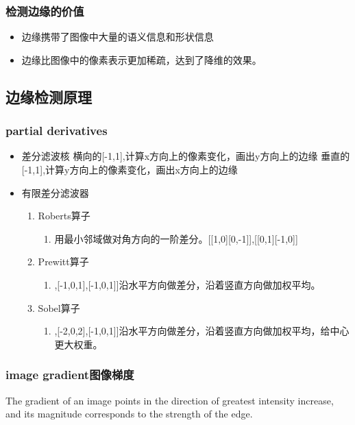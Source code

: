 \documentclass[UTF8]{ctexart}
\begin{document}
\subsubsection{检测边缘的价值}
\begin{itemize}
    \item 边缘携带了图像中大量的语义信息和形状信息
    \item 边缘比图像中的像素表示更加稀疏，达到了降维的效果。
\end{itemize}

\subsection{边缘检测原理}

\subsubsection{partial derivatives}
\begin{itemize}
    \item 差分滤波核
    横向的[-1,1],计算x方向上的像素变化，画出y方向上的边缘
    垂直的[-1,1],计算y方向上的像素变化，画出x方向上的边缘

    \item 有限差分滤波器
    \begin{enumerate}
        \item Roberts算子
        \begin{enumerate}
            \item 用最小邻域做对角方向的一阶差分。[[1,0][0,-1]],[[0,1][-1,0]]
        \end{enumerate}
        \item Prewitt算子
        \begin{enumerate}
            \item [[-1,0,1],[-1,0,1],[-1,0,1]]沿水平方向做差分，沿着竖直方向做加权平均。
        \end{enumerate}
        \item Sobel算子
        \begin{enumerate}
            \item [[-1,0,1],[-2,0,2],[-1,0,1]]沿水平方向做差分，沿着竖直方向做加权平均，给中心更大权重。
        \end{enumerate}
    \end{enumerate}
\end{itemize}

\subsubsection{image gradient图像梯度}
The gradient of an image points in the direction of greatest intensity increase, and its magnitude corresponds to the strength of the edge. 
\end{document}
